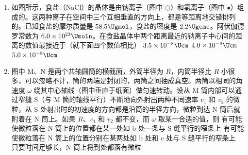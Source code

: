 \documentclass[\gkver]{gaokaozhenti}
\begin{document}
\begin{enumerate}

\item
如图所示，食盐（NaCl）的晶体是由钠离子（图中 $\bigcirc$）和氯离子（图中 $\bullet$）组成的。这两种离子在空间中三个互相垂直的方向上，都是等距离地交错排列的。已知食盐的摩尔质量是 $58.5\Ugmol$，食盐的密度是 $2.2\Ugcmc$。阿伏伽德罗常数为 $6.0\times10^{23}\Umoln$。在食盐晶体中两个距离最近的钠离子中心间的距离的数值最接近于（就下面四个数值相比）
{$3.5\times10^{-8}\Ucm$}
{$4.0\times10^{-8}\Ucm$}
{$5.0\times10^{-8}\Ucm$}


\item
图中 M、N 是两个共轴圆筒的横截面，外筒半径为 $R$，内筒半径比 $R$ 小很多，可以忽略不计，筒的两端是封闭的，两筒之间抽成真空。两筒以相同的角速度 $\omega$ 绕其中心轴线（图中垂直于纸面）做匀速转动。设从 M 筒内部可以通过窄缝 S（与 M 筒的轴线平行）不断地向外射出两种不同速率 $v_{1}$ 和 $v_{2}$ 的微粒，从 S 处射出时的初速度的方向都是沿筒的半径方向，微粒到达 N 筒后就附着在 N 筒上。如果 $R$、$v_{1}$ 和 $v_{2}$ 都不变，而 $\omega$ 取某一合适的值，则
{有可能使微粒落在 N 筒上的位置都在某一处如 b 处一条与 S 缝平行的窄条上}
{有可能使微粒落在 N 筒上的位置分别在某两处如 b 处和 c 处与 S 缝平行的窄条上}
{只要时间足够长，N 筒上将到处都落有微粒}


\end{enumerate}
\end{document}
